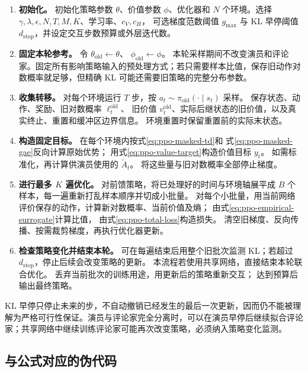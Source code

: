 \documentclass[UTF8,12pt,a4paper,fontset=fandol]{ctexart}
\begin{document}
\begin{enumerate}
  \item \textbf{初始化。}
  初始化策略参数 $\theta$、价值参数 $\phi$、优化器和 $N$ 个环境。选择
  $\gamma,\lambda,\epsilon,N,T,M,K$、学习率、$c_V,c_H$，
  可选梯度范数阈值 $g_{\max}$ 与 KL 早停阈值
  $d_{\mathrm{stop}}$，并设定交互步数预算或外层迭代数。

  \item \textbf{固定本轮参考。}
  令 $\theta_{\mathrm{old}}\leftarrow\theta$、
  $\phi_{\mathrm{old}}\leftarrow\phi$。
  本轮采样期间不改变演员和评论家。固定所有影响策略输入的预处理方式；若只需要样本比值，保存旧动作对数概率就足够，但精确 KL 可能还需要旧策略的完整分布参数。

  \item \textbf{收集转移。}
  对每个环境运行 $T$ 步，按
  $a_t\sim\pi_{\mathrm{old}}(\cdot\mid s_t)$ 采样。
  保存状态、动作、奖励、旧对数概率 $\ell_t^{\mathrm{old}}$、
  旧价值 $v_t^{\mathrm{old}}$、实际后继状态的旧价值，以及真实终止、重置和缓冲区边界信息。
  环境重置时保留重置前的实际末状态。

  \item \textbf{构造固定目标。}
  在每个环境内按式\eqref{eq:ppo-masked-td}和
  式\eqref{eq:ppo-masked-gae}反向计算原始优势；
  用式\eqref{eq:ppo-value-target}构造价值目标 $y_t$。
  如需标准化，再计算供演员使用的 $\widetilde A_t$。
  将这些量与旧对数概率全部停止梯度。

  \item \textbf{进行最多 $K$ 遍优化。}
  对前馈策略，将已处理好的时间与环境轴展平成 $B$ 个样本，每一遍重新打乱样本顺序并切成小批量。
  对每个小批量，用当前网络评价保存的动作，计算新对数概率、当前价值及熵；
  由式\eqref{eq:ppo-empirical-surrogate}计算比值，
  由式\eqref{eq:ppo-total-loss}构造损失。
  清空旧梯度、反向传播、按需裁剪梯度，再执行优化器更新。

  \item \textbf{检查策略变化并结束本轮。}
  可在每遍结束后用整个旧批次监测 KL；若超过
  $d_{\mathrm{stop}}$，停止后续会改变策略的更新。
  本流程若使用共享网络，直接结束本轮联合优化。
  丢弃当前批次的训练用途，用更新后的策略重新交互；
  达到预算后输出最终策略。
\end{enumerate}

KL 早停只停止未来的步，不自动撤销已经发生的最后一次更新，因而仍不能被理解为严格可行性保证。演员与评论家完全分离时，可以在演员早停后继续拟合评论家；共享网络中继续训练评论家可能再次改变策略，必须纳入策略变化监测。

\subsection{与公式对应的伪代码}
\end{document}
